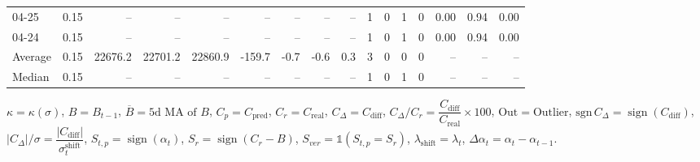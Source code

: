 \begin{threeparttable}
{\begin{tabular}{lrrrrrrrrrrrrrrr}
  04-25 &     0.15 &      -- &      -- &      -- &         -- &             -- &                       -- &                  -- &              1 &         0 &     1 &         0 &       0.00 &      0.94 &           0.00 \\
  04-24 &     0.15 &      -- &      -- &      -- &         -- &             -- &                       -- &                  -- &              1 &         0 &     1 &         0 &       0.00 &      0.94 &           0.00 \\
Average &     0.15 & 22676.2 & 22701.2 & 22860.9 &     -159.7 &           -0.7 &                     -0.6 &                 0.3 &              3 &         0 &     0 &         0 &         -- &        -- &             -- \\
 Median &     0.15 &      -- &      -- &      -- &         -- &             -- &                       -- &                  -- &              1 &         0 &     1 &         0 &         -- &        -- &             -- \\
\bottomrule
\end{tabular}
}
\begin{tablenotes}\footnotesize
\item $\kappa=\kappa(\sigma)$, $B=B_{t-1}$, $\overline{B}=\text{5d MA of }B$, $C_p=C_{\text{pred}}$, $C_r=C_{\text{real}}$, $C_\Delta=C_{\text{diff}}$, $C_\Delta/C_r=\dfrac{C_{\text{diff}}}{C_{\text{real}}}\times100$, $\mathrm{Out}=\text{Outlier}$, $\mathrm{sgn}\,C_\Delta=\operatorname{sign}(C_{\text{diff}})$, $|C_\Delta|/\sigma=\dfrac{|C_{\text{diff}}|}{\sigma_t^{\text{shift}}}$, $S_{t,p}=\operatorname{sign}(\alpha_t)$, $S_r=\operatorname{sign}(C_r - B)$, $S_{ver}=\mathbb{1}(S_{t,p}=S_r)$, $\lambda_{\text{shift}}=\lambda_t$, $\Delta\alpha_t=\alpha_t-\alpha_{t-1}$.\end{tablenotes}
\end{threeparttable}
\endgroup

